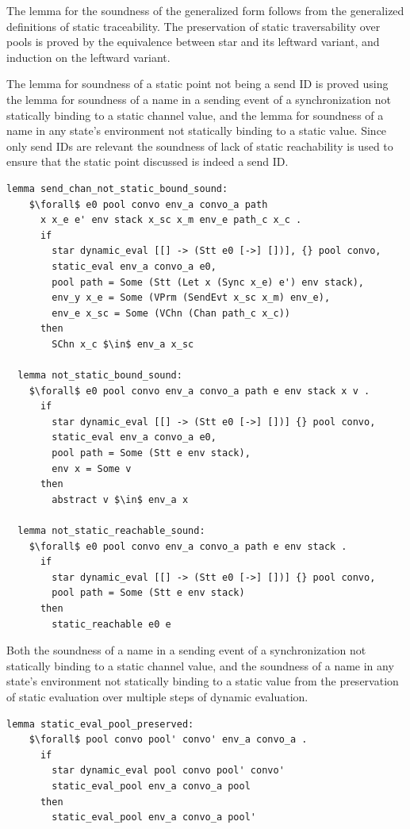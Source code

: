 \documentclass{article}
\begin{document}
The lemma for the soundness of the generalized form follows from the generalized definitions
of static traceability. The preservation of static traversability over pools is proved by the
equivalence between star and its leftward variant, and induction on the leftward variant.

The lemma for soundness of a static point not being a send ID is proved using the lemma for
soundness of a name in a sending event of a synchronization not statically binding to a static
channel value, and the lemma for soundness of a name in any state's environment
not statically binding to a static value.  Since only send IDs are relevant
the soundness of lack of static reachability is
used to ensure that the static point discussed is indeed a send ID. 

\begin{lstlisting}[language=logic, mathescape]
  lemma send_chan_not_static_bound_sound:
    $\forall$ e0 pool convo env_a convo_a path
      x x_e e' env stack x_sc x_m env_e path_c x_c .
      if
        star dynamic_eval [[] -> (Stt e0 [->] [])], {} pool convo,
        static_eval env_a convo_a e0,
        pool path = Some (Stt (Let x (Sync x_e) e') env stack),
        env_y x_e = Some (VPrm (SendEvt x_sc x_m) env_e),
        env_e x_sc = Some (VChn (Chan path_c x_c))
      then
        SChn x_c $\in$ env_a x_sc

  lemma not_static_bound_sound:
    $\forall$ e0 pool convo env_a convo_a path e env stack x v .
      if
        star dynamic_eval [[] -> (Stt e0 [->] [])] {} pool convo,
        static_eval env_a convo_a e0, 
        pool path = Some (Stt e env stack), 
        env x = Some v
      then
        abstract v $\in$ env_a x

  lemma not_static_reachable_sound:
    $\forall$ e0 pool convo env_a convo_a path e env stack .
      if
        star dynamic_eval [[] -> (Stt e0 [->] [])] {} pool convo,
        pool path = Some (Stt e env stack)
      then
        static_reachable e0 e
\end{lstlisting}

Both the soundness of a name in a sending event of a synchronization not statically binding
to a static
channel value, and the soundness of a name in any state's environment not statically binding
to a static value from the preservation of static evaluation over multiple steps of dynamic
evaluation.

\begin{lstlisting}[language=logic, mathescape]
  lemma static_eval_pool_preserved:
    $\forall$ pool convo pool' convo' env_a convo_a .
      if
        star dynamic_eval pool convo pool' convo' 
        static_eval_pool env_a convo_a pool
      then
        static_eval_pool env_a convo_a pool'
\end{lstlisting}
\end{document}
